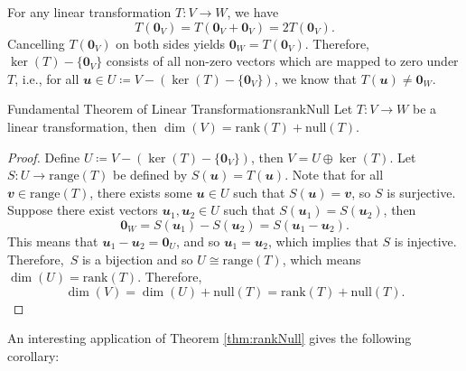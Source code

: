 \documentclass[math]{amznotes}
\theoremstyle{remark}
\newcommand{\zero}{\mathbf{0}}
\begin{document}
For any linear transformation $T \colon V \to W$, we have 
\begin{equation*}
    T(\zero_V) = T(\zero_V + \zero_V) = 2T(\zero_V).
\end{equation*}
Cancelling $T(\zero_V)$ on both sides yields $\zero_W = T(\zero_V)$. Therefore, $\ker(T) - \{\zero_V\}$ consists of all non-zero vectors which are mapped to zero under $T$, i.e., for all $\mathbfit{u} \in U \coloneqq V - (\ker(T) - \{\zero_V\})$, we know that $T(\mathbfit{u}) \neq \zero_W$. 
\begin{thmbox}{Fundamental Theorem of Linear Transformations}{rankNull}
    Let $T \colon V \to W$ be a linear transformation, then $\dim(V) = \mathrm{rank}(T) + \mathrm{null}(T)$.
    \tcblower
    \begin{proof}
        Define $U \coloneqq V - (\ker(T) - \{\zero_V\})$, then $V = U \oplus \ker(T)$. Let $S \colon U \to \mathrm{range}(T)$ be defined by $S(\mathbfit{u}) = T(\mathbfit{u})$. Note that for all $\mathbfit{v} \in \mathrm{range}(T)$, there exists some $\mathbfit{u} \in U$ such that $S(\mathbfit{u}) = \mathbfit{v}$, so $S$ is surjective. Suppose there exist vectors $\mathbfit{u}_1, \mathbfit{u}_2 \in U$ such that $S(\mathbfit{u}_1) = S(\mathbfit{u}_2)$, then
        \begin{equation*}
            \zero_W = S(\mathbfit{u}_1) - S(\mathbfit{u}_2) = S(\mathbfit{u}_1 - \mathbfit{u}_2).
        \end{equation*}
        This means that $\mathbfit{u}_1 - \mathbfit{u}_2 = \zero_U$, and so $\mathbfit{u}_1 = \mathbfit{u}_2$, which implies that $S$ is injective. Therefore,~$S$ is a bijection and so $U \cong \mathrm{range}(T)$, which means $\dim(U) = \mathrm{rank}(T)$. Therefore,
        \begin{equation*}
            \dim(V) = \dim(U) + \mathrm{null}(T) = \mathrm{rank}(T) + \mathrm{null}(T).
        \end{equation*}
    \end{proof}
\end{thmbox}
An interesting application of Theorem \ref{thm:rankNull} gives the following corollary:
\end{document}
